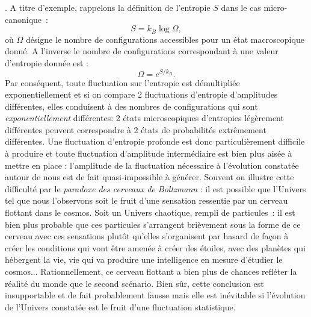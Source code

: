 . A titre d'exemple, rappelons la définition de l'entropie $S$ dans le cas micro-canonique~:
\begin{equation}
S=k_B\log{\Omega},
\end{equation}
où $\Omega$ désigne le nombre de configurations accessibles pour un état macroscopique donné. A l'inverse le nombre de configurations correspondant à une valeur d'entropie donnée est :
\begin{equation}
\Omega=e^{S/k_B}.
\end{equation}
Par conséquent, toute fluctuation sur l'entropie est démultipliée exponentiellement et si on compare 2 fluctuations d'entropie d'amplitudes différentes, elles conduisent à des nombres de configurations qui sont \textit{exponentiellement} différentes: 2 états microscopiques d'entropies légèrement différentes peuvent correspondre à 2 états de probabilités extrêmement différentes. Une fluctuation d'entropie profonde est donc particulièrement difficile à produire et toute fluctuation d'amplitude intermédiaire est bien plus aisée à mettre en place : l'amplitude de la fluctuation nécessaire à l'évolution constatée autour de nous est de fait quasi-impossible à générer. Souvent on illustre cette difficulté par le \textit{paradoxe des cerveaux de Boltzmann} : il est possible que l'Univers tel que nous l'observons soit le fruit d'une sensation ressentie par un cerveau flottant dans le cosmos. Soit un Univers chaotique, rempli de particules~: il est bien plus probable que ces particules s'arrangent brièvement sous la forme de ce cerveau avec ces sensations plutôt qu'elles s'organisent par  hasard de façon à créer les conditions qui vont être amenée à créer des étoiles, avec des planètes qui hébergent la vie, vie qui va produire une intelligence en mesure d'étudier le cosmos... Rationnellement, ce cerveau flottant a bien plus de chances refléter la réalité du monde que le second scénario. Bien sûr, cette conclusion est insupportable et de fait probablement fausse mais elle est inévitable si l'évolution de l'Univers constatée est le fruit d'une fluctuation statistique.